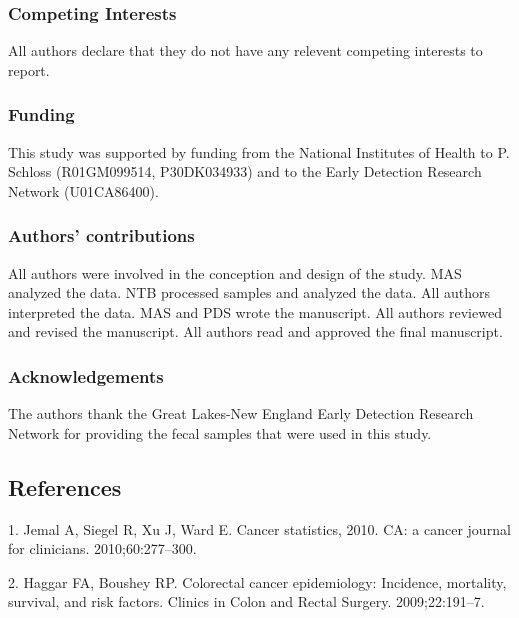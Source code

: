 \documentclass[12pt,]{article}
\begin{document}
\subsubsection{Competing Interests}\label{competing-interests}

All authors declare that they do not have any relevent competing
interests to report.

\subsubsection{Funding}\label{funding}

This study was supported by funding from the National Institutes of
Health to P. Schloss (R01GM099514, P30DK034933) and to the Early
Detection Research Network (U01CA86400).

\subsubsection{Authors' contributions}\label{authors-contributions}

All authors were involved in the conception and design of the study. MAS
analyzed the data. NTB processed samples and analyzed the data. All
authors interpreted the data. MAS and PDS wrote the manuscript. All
authors reviewed and revised the manuscript. All authors read and
approved the final manuscript.

\subsubsection{Acknowledgements}\label{acknowledgements}

The authors thank the Great Lakes-New England Early Detection Research
Network for providing the fecal samples that were used in this study.

\newpage

\subsection*{References}\label{references}

\hypertarget{refs}{}
\hypertarget{ref-jemal_cancer_2010}{}
1. Jemal A, Siegel R, Xu J, Ward E. Cancer statistics, 2010. CA: a
cancer journal for clinicians. 2010;60:277--300.

\hypertarget{ref-haggar_colorectal_2009}{}
2. Haggar FA, Boushey RP. Colorectal cancer epidemiology: Incidence,
mortality, survival, and risk factors. Clinics in Colon and Rectal
Surgery. 2009;22:191--7.
\end{document}
